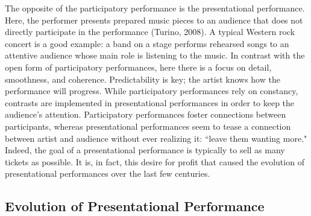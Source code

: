 The opposite of the participatory performance is the presentational performance. Here, the performer presents prepared music pieces to an audience that does not directly participate in the performance (Turino, 2008). A typical Western rock concert is a good example: a band on a stage performs rehearsed songs to an attentive audience whose main role is listening to the music. In contrast with the open form of participatory performances, here there is a focus on detail, smoothness, and coherence. Predictability is key; the artist knows how the performance will progress. While participatory performances rely on constancy, contrasts are implemented in presentational performances in order to keep the audience's attention. Participatory performances foster connections between participants, whereas presentational performances seem to tease a connection between artist and audience without ever realizing it: ``leave them wanting more." Indeed, the goal of a presentational performance is typically to sell as many tickets as possible. It is, in fact, this desire for profit that caused the evolution of presentational performances over the last few centuries.

\subsection{Evolution of Presentational Performance}

